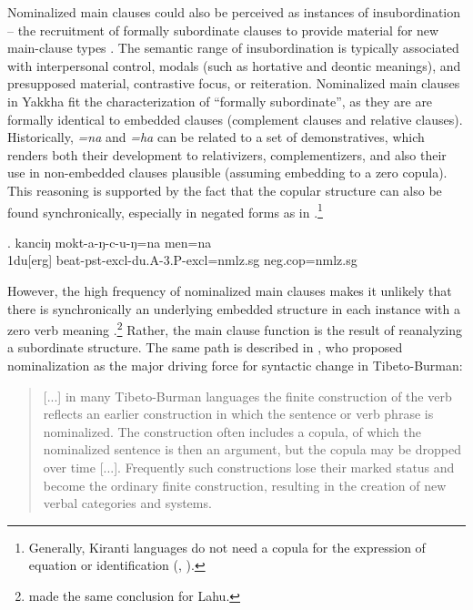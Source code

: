 Nominalized main clauses could also be perceived as instances of insubordination – the  recruitment of formally subordinate clauses to provide material for new main-clause types \citep{Evans2007_Insubordination}. The semantic range of insubordination is typically associated with interpersonal control, modals (such as hortative and deontic meanings), and presupposed material, contrastive focus, or reiteration. Nominalized main clauses in Yakkha fit the characterization of “formally subordinate”, as they are are formally identical to embedded clauses (complement clauses and relative clauses). 
Historically,   \emph{=na} and \emph{=ha} can be related to a set of demonstratives, which renders both their development to relativizers, complementizers, and also their use in  non-embedded  clauses plausible (assuming embedding to a zero copula). This reasoning is supported by the fact that the copular structure can also be found synchronically, especially in negated forms as in \Next.\footnote{Generally,  Kiranti languages do not need a copula for the expression of equation or identification (\citet[276]{Bickel1999Nominalization}, \citealt[105]{Ebert1994The-structure}).}  

 \exg. kanciŋ  mokt-a-ŋ-c-u-ŋ=na  men=na\\
{\sc 1du[erg]} beat{\sc -pst-excl-du.A-3.P-excl=nmlz.sg} {\sc neg.cop=nmlz.sg}\\
  
 

However, the high frequency of nominalized main clauses makes it unlikely that there is synchronically an underlying embedded structure in each instance with a zero verb meaning .\footnote{\citet{Matisoff1972Lahu} made the same conclusion for Lahu.} Rather, the main clause function is the result of reanalyzing a subordinate structure. The same path is described in \citet{DeLancey2011_Finite}, who proposed nominalization as the major driving force for syntactic change in Tibeto-Burman:\\
 
\begin{quote} 
[...] in many Tibeto-Burman languages the finite construction of the verb reflects an earlier construction in which the sentence or verb phrase is nominalized. The construction  often  includes  a  copula,  of  which  the  nominalized  sentence  is  then  an argument, but the copula may be dropped over time [...]. Frequently  such  constructions  lose  their marked  status  and  become  the  ordinary  finite  construction,  resulting  in  the creation  of  new  verbal  categories  and  systems. \citep[343]{DeLancey2011_Finite}
\end{quote}
 
